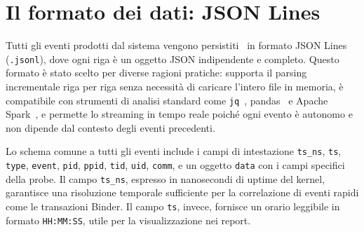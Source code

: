 \section{Il formato dei dati: JSON Lines}

Tutti gli eventi prodotti dal sistema vengono persistiti~\cite{data_persistence} in formato JSON Lines~\cite{jsonlines} (\texttt{.jsonl}), dove ogni riga è un oggetto JSON indipendente e completo. Questo formato è stato scelto per diverse ragioni pratiche: supporta il parsing incrementale riga per riga senza necessità di caricare l'intero file in memoria, è compatibile con strumenti di analisi standard come \texttt{jq}~\cite{jq_tool}, pandas~\cite{pandas} e Apache Spark~\cite{apache_spark}, e permette lo streaming in tempo reale poiché ogni evento è autonomo e non dipende dal contesto degli eventi precedenti.

Lo schema comune a tutti gli eventi include i campi di intestazione \texttt{ts\_ns}, \texttt{ts}, \texttt{type}, \texttt{event}, \texttt{pid}, \texttt{ppid}, \texttt{tid}, \texttt{uid}, \texttt{comm}, e un oggetto \texttt{data} con i campi specifici della probe. Il campo \texttt{ts\_ns}, espresso in nanosecondi di uptime del kernel, garantisce una risoluzione temporale sufficiente per la correlazione di eventi rapidi come le transazioni Binder. Il campo \texttt{ts}, invece, fornisce un orario leggibile in formato \texttt{HH:MM:SS}, utile per la visualizzazione nei report.

